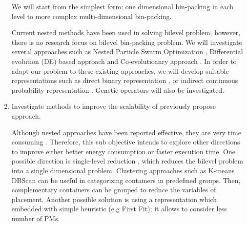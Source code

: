 \begin{enumerate}
	 We will start from the simplest form: one dimensional bin-packing in each level to more complex multi-dimensional bin-packing.

	Current nested methods have been used in solving bilevel problem, however, there is no research focus on bilevel bin-packing problem. We will investigate several approaches such as Nested Particle Swarm Optimization \cite{Li:2006br}, Differential evolution (DE) based approach \cite{Angelo:2013ee, Zhu:2006in} and Co-evolutioanry approach \cite{Legillon:2012dd}. In order to adapt our problem to these existing approaches, we will develop suitable representations such as direct binary representation \cite{Xu:2010vh}, or indirect continuous probability representation \cite{Xiong:2014jq}. Genetic operators will also be investigated.

	\item Investigate methods to improve the scalability of previously propose approach.

	 Although nested approaches have been reported effective, they are very time consuming \cite{}. Therefore, this sub objective intends to explore other directions to improve either better energy consumption or faster execution time. One possible direction is single-level reduction \cite{}, which reduces the bilevel problem into a single dimensional problem. Clustering approaches such as K-means \cite{}, DBScan \cite{} can be useful in categorizing containers in predefined groups. Then, complementary containers can be grouped to reduce the variables of placement. Another possible solution is using a representation which embedded with simple heuristic (e.g First Fit); it allows to consider less number of PMs.  

\end{enumerate}
